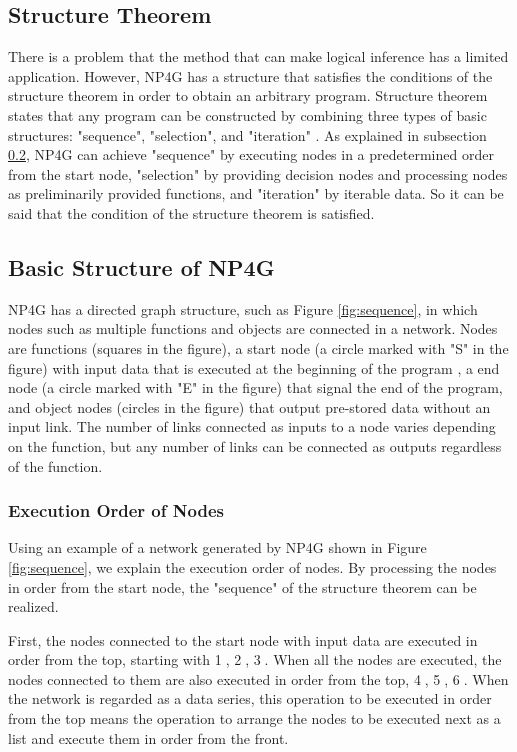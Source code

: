 \documentclass{article}
\begin{document}
\subsection {Structure Theorem}
There is a problem that the method that can make logical inference has a limited application.
However, NP4G has a structure that satisfies the conditions of the structure theorem in order to obtain an arbitrary program.
Structure theorem states that any program can be constructed by combining three types of basic structures: "sequence", "selection", and "iteration" \cite{StructuredProgramming}.
As explained in subsection \ref{sec:struct}, NP4G can achieve "sequence" by executing nodes in a predetermined order from the start node, "selection" by providing decision nodes and processing nodes as preliminarily provided functions, and "iteration" by iterable data. 
So it can be said that the condition of the structure theorem is satisfied.

\subsection{Basic Structure of NP4G}
\label{sec:struct}
NP4G has a directed graph structure, such as Figure \ref{fig:sequence}, in which nodes such as multiple functions and objects are connected in a network.
Nodes are functions (squares in the figure), a start node (a circle marked with "S" in the figure) with input data that is executed at the beginning of the program , a end node (a circle marked with "E" in the figure) that signal the end of the program, and object nodes (circles in the figure) that output pre-stored data without an input link.
The number of links connected as inputs to a node varies depending on the function, but any number of links can be connected as outputs regardless of the function.

\subsubsection {Execution Order of Nodes}
\label{sec:sequence}
Using an example of a network generated by NP4G shown in Figure \ref{fig:sequence}, we explain the execution order of nodes.
By processing the nodes in order from the start node, the "sequence" of the structure theorem can be realized.

First, the nodes connected to the start node with input data are executed in order from the top, starting with \textcircled{\scriptsize 1}, \textcircled{\scriptsize 2}, \textcircled{\scriptsize 3}.
When all the nodes are executed, the nodes connected to them are also executed in order from the top, \textcircled{\scriptsize 4}, \textcircled{\scriptsize 5}, \textcircled{\scriptsize 6}.
When the network is regarded as a data series, this operation to be executed in order from the top means the operation to arrange the nodes to be executed next as a list and execute them in order from the front.
\end{document}
